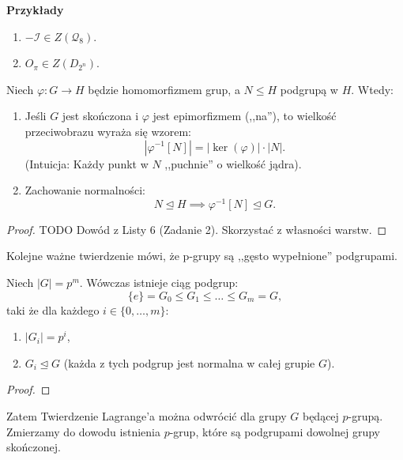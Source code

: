 \noindent \textbf{Przykłady}
\begin{enumerate}[label=\arabic*.]
	\item $-\mathcal{I}\in Z(\mathcal{Q}_{8}).$ 
	\item $O_{\pi}\in Z(D_{2^{n}}).$
\end{enumerate}

\begin{lemma}[O przeciwobrazie]
    Niech $\varphi : G \to H$ będzie homomorfizmem grup, a $N \le H$ podgrupą w $H$. Wtedy:
    \begin{enumerate}[label=\arabic*.]
        \item Jeśli $G$ jest skończona i $\varphi$ jest epimorfizmem (,,na''), to wielkość przeciwobrazu wyraża się wzorem:
            \[ \left| \varphi ^{-1} [ N ] \right| = \left| \ker(\varphi ) \right| \cdot \left| N \right|. \]
            (Intuicja: Każdy punkt w $N$ ,,puchnie'' o wielkość jądra).
        \item Zachowanie normalności:
            \[ N \unlhd H \implies \varphi ^{-1}[ N ] \unlhd G. \]
    \end{enumerate}
\end{lemma}
\begin{proof}
    TODO Dowód z Listy 6 (Zadanie 2). Skorzystać z własności warstw.
\end{proof}

\noindent Kolejne ważne twierdzenie mówi, że p-grupy są ,,gęsto wypełnione'' podgrupami.

\begin{theorem}
    Niech $|G| = p^m$. Wówczas istnieje ciąg podgrup:
    \[
    \{e\} = G_0 \le G_1 \le \ldots \le G_m = G,
    \] 
    taki że dla każdego $i \in \{0, \ldots, m\}$:
    \begin{enumerate}
        \item $|G_i| = p^i$,
        \item $G_i \unlhd G$ (każda z tych podgrup jest normalna w całej grupie $G$).
    \end{enumerate}
\end{theorem} 
\begin{proof}
\end{proof} 

\begin{corollary}
	Zatem Twierdzenie Lagrange'a można odwrócić dla grupy $G$ będącej $p$-grupą. Zmierzamy do dowodu istnienia $p$-grup, które są podgrupami dowolnej grupy skończonej.
\end{corollary}

